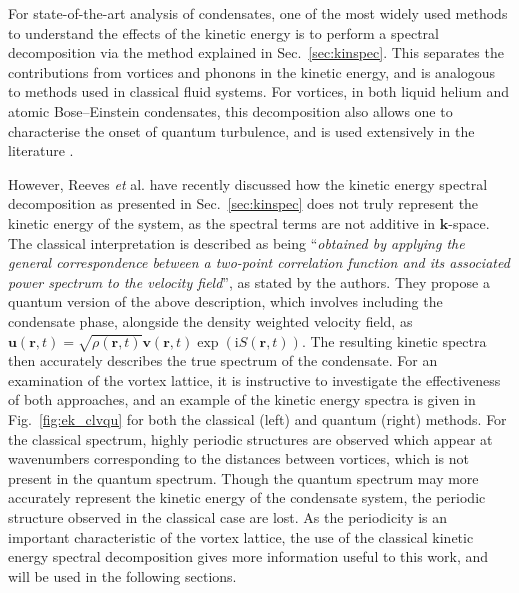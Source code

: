 For state-of-the-art analysis of condensates, one of the most widely used methods to understand the effects of the kinetic energy is to perform a spectral decomposition via the method explained in Sec.~\ref{sec:kinspec}. This separates the contributions from vortices and phonons in the kinetic energy, and is analogous to methods used in classical fluid systems. For vortices, in both liquid helium and atomic Bose--Einstein condensates, this decomposition also allows one to characterise the onset of quantum turbulence, and is used extensively in the literature \cite{VTX:Kobayashi_prl_2005,VTX:Tsubota_jphys_2009,CT:Bradley_prx_2012,VTX:White_jphys_2014,VTX:Skaugen_pre_2016}. %

However, Reeves {\it et} al. \cite{VTX:Reeves_pra_2014} have recently discussed how the kinetic energy spectral decomposition as presented in Sec.~\ref{sec:kinspec} does not truly represent the kinetic energy of the system, as the spectral terms are not additive in $\mathbf{k}$-space. The classical interpretation is described as being ``\textit{obtained by applying the general correspondence between a two-point correlation function and its associated
power spectrum to the velocity field}'', as stated by the authors. They propose a quantum version of the above description, which involves including the condensate phase, alongside the density weighted velocity field, as $\mathbf{u}(\mathbf{r},t) = \sqrt{\rho(\mathbf{r},t)}\mathbf{v}(\mathbf{r},t)\exp\left(\textrm{i}S(\mathbf{r},t)\right)$. The resulting kinetic spectra then accurately describes the true spectrum of the condensate. For an examination of the vortex lattice, it is instructive to investigate the effectiveness of both approaches, and an example of the kinetic energy spectra is given in Fig.~\ref{fig:ek_clvqu} for both the classical (left) and quantum (right) methods. For the classical spectrum, highly periodic structures are observed which appear at wavenumbers corresponding to the distances between vortices, which is not present in the quantum spectrum. Though the quantum spectrum may more accurately represent the kinetic energy of the condensate system, the periodic structure observed in the classical case are lost. As the periodicity is an important characteristic of the vortex lattice, the use of the classical kinetic energy spectral decomposition gives more information useful to this work, and will be used in the following sections.

